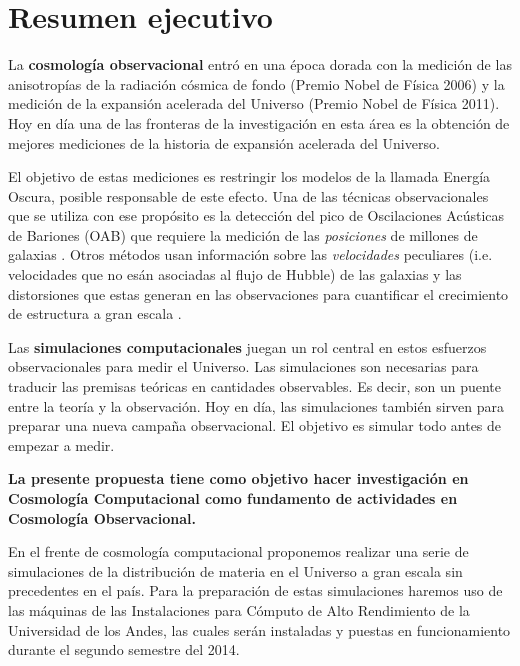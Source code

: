 
\section{Resumen ejecutivo}

La {\bf cosmología observacional} entró en una época dorada con la medición
de las anisotropías de la radiación cósmica de fondo (Premio Nobel de
Física 2006) y la medición de la expansión acelerada del Universo
(Premio Nobel de Física 2011).  
Hoy en d\'ia una de las fronteras de la investigación en esta \'area 
es la obtenci\'on de mejores mediciones de la historia de expansión
acelerada del Universo. 

El objetivo de estas mediciones es restringir los  modelos de la
llamada Energ\'ia Oscura, posible responsable de este efecto. 
Una de las t\'ecnicas observacionales que se utiliza con ese
prop\'osito es la detecci\'on del pico de Oscilaciones Ac\'usticas de
Bariones (OAB) que requiere la medici\'on de las \emph{posiciones} de
millones de galaxias \cite{Eisenstein2005}. 
Otros m\'etodos usan informaci\'on sobre las \emph{velocidades}
peculiares (i.e. velocidades que no es\'an asociadas al flujo de
Hubble) de las galaxias y las distorsiones que estas generan en las
observaciones para cuantificar el crecimiento de estructura a gran
escala \cite{Scoccimarro2004}. 

Las {\bf simulaciones computacionales} juegan un rol central en estos
esfuerzos observacionales para medir el Universo.
Las simulaciones son necesarias para traducir las premisas te\'oricas
en cantidades observables. 
Es decir, son un puente entre la teor\'ia y
la  observaci\'on. 
Hoy en d\'ia,  las simulaciones tambi\'en sirven para preparar una
nueva campa\~na observacional.  
El objetivo es simular todo antes de empezar a medir. 


{\bf La presente propuesta tiene como objetivo hacer investigaci\'on en
Cosmolog\'ia Computacional como fundamento de actividades en
Cosmolog\'ia Observacional.}

En el frente de cosmolog\'ia computacional proponemos realizar una serie de
simulaciones de la distribuci\'on de materia en el Universo a gran
escala sin precedentes en el pa\'is. 
Para la preparaci\'on de estas simulaciones haremos uso de las
m\'aquinas de las Instalaciones para C\'omputo de Alto Rendimiento de
la Universidad de los Andes, las cuales ser\'an instaladas y puestas
en funcionamiento durante el segundo semestre del 2014.

